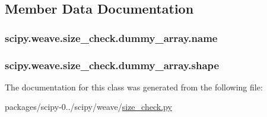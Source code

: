 \subsection{Member Data Documentation}
\hypertarget{classscipy_1_1weave_1_1size__check_1_1dummy__array_ad6522fa516f1109776c546297c104760}{}
\subsubsection[{name}]{\setlength{\rightskip}{0pt plus 5cm}scipy.\+weave.\+size\+\_\+check.\+dummy\+\_\+array.\+name}\label{classscipy_1_1weave_1_1size__check_1_1dummy__array_ad6522fa516f1109776c546297c104760}
\hypertarget{classscipy_1_1weave_1_1size__check_1_1dummy__array_afae75b13e29a2dd86ae8c5cd0dfd6f61}{}
\subsubsection[{shape}]{\setlength{\rightskip}{0pt plus 5cm}scipy.\+weave.\+size\+\_\+check.\+dummy\+\_\+array.\+shape}\label{classscipy_1_1weave_1_1size__check_1_1dummy__array_afae75b13e29a2dd86ae8c5cd0dfd6f61}


The documentation for this class was generated from the following file\+:\begin{DoxyCompactItemize}
\item 
packages/scipy-\/0../scipy/weave/\hyperlink{size__check_8py}{size\+\_\+check.\+py}\end{DoxyCompactItemize}
